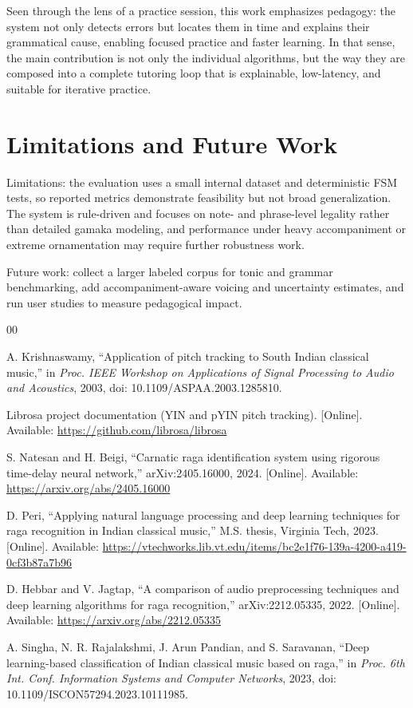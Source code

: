 \documentclass{ieeeaccess}
\begin{document}
Seen through the lens of a practice session, this work emphasizes pedagogy: the system not only detects errors but locates them in time and explains their grammatical cause, enabling focused practice and faster learning. In that sense, the main contribution is not only the individual algorithms, but the way they are composed into a complete tutoring loop that is explainable, low-latency, and suitable for iterative practice.

\section*{Limitations and Future Work}

Limitations: the evaluation uses a small internal dataset and deterministic FSM tests, so reported metrics demonstrate feasibility but not broad generalization. The system is rule-driven and focuses on note- and phrase-level legality rather than detailed gamaka modeling, and performance under heavy accompaniment or extreme ornamentation may require further robustness work.

Future work: collect a larger labeled corpus for tonic and grammar benchmarking, add accompaniment-aware voicing and uncertainty estimates, and run user studies to measure pedagogical impact.

\begin{thebibliography}{00}

A. Krishnaswamy, ``Application of pitch tracking to South Indian classical music,'' in \textit{Proc. IEEE Workshop on Applications of Signal Processing to Audio and Acoustics}, 2003, doi: 10.1109/ASPAA.2003.1285810.

Librosa project documentation (YIN and pYIN pitch tracking). [Online]. Available: \url{https://github.com/librosa/librosa}

S. Natesan and H. Beigi, ``Carnatic raga identification system using rigorous time-delay neural network,'' arXiv:2405.16000, 2024. [Online]. Available: \url{https://arxiv.org/abs/2405.16000}

D. Peri, ``Applying natural language processing and deep learning techniques for raga recognition in Indian classical music,'' M.S. thesis, Virginia Tech, 2023. [Online]. Available: \url{https://vtechworks.lib.vt.edu/items/bc2e1f76-139a-4200-a419-0cf3b87a7b96}

D. Hebbar and V. Jagtap, ``A comparison of audio preprocessing techniques and deep learning algorithms for raga recognition,'' arXiv:2212.05335, 2022. [Online]. Available: \url{https://arxiv.org/abs/2212.05335}

A. Singha, N. R. Rajalakshmi, J. Arun Pandian, and S. Saravanan, ``Deep learning-based classification of Indian classical music based on raga,'' in \textit{Proc. 6th Int. Conf. Information Systems and Computer Networks}, 2023, doi: 10.1109/ISCON57294.2023.10111985.

\end{thebibliography}
\clearpage
\end{document}
